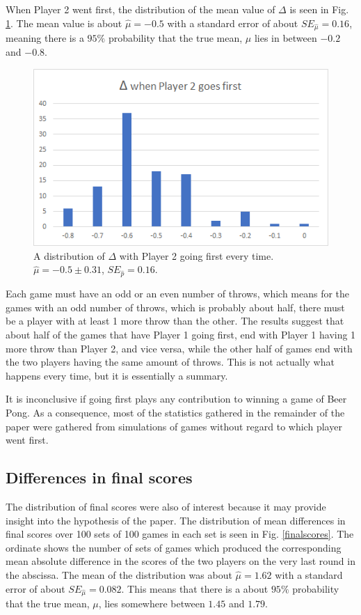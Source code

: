\documentclass{article}
\begin{document}
When Player 2 went first, the distribution of the mean value of $\Delta$ is seen in Fig. \ref{delta2goesfirst}. The mean value is about $\hat{\mu} = -0.5$ with a standard error of about $SE_{\hat{\mu}} = 0.16$, meaning there is a $95\%$ probability that the true mean, $\mu$ lies in between $-0.2$ and $-0.8$.

\begin{figure}
	\centering
	\includegraphics[width=0.7\linewidth]{delta2goesfirst}
	\caption{A distribution of $\Delta$ with Player 2 going first every time. $\hat{\mu} = -0.5 \pm 0.31$, $SE_{\hat{p}} = 0.16$.}
	\label{delta2goesfirst}
\end{figure}

Each game must have an odd or an even number of throws, which means for the games with an odd number of throws, which is probably about half, there must be a player with at least 1 more throw than the other. The results suggest that about half of the games that have Player 1 going first, end with Player 1 having 1 more throw than Player 2, and vice versa, while the other half of games end with the two players having the same amount of throws. This is not actually what happens every time, but it is essentially a summary.

It is inconclusive if going first plays any contribution to winning a game of Beer Pong. As a consequence, most of the statistics gathered in the remainder of the paper were gathered from simulations of games without regard to which player went first.

\subsection{Differences in final scores}
The distribution of final scores were also of interest because it may provide insight into the hypothesis of the paper. The distribution of mean differences in final scores over 100 sets of 100 games in each set is seen in Fig. \ref{finalscores}. The ordinate shows the number of sets of games which produced the corresponding mean absolute difference in the scores of the two players on the very last round in the abscissa. The mean of the distribution was about $\hat{\mu} = 1.62$ with a standard error of about $SE_{\hat{\mu}} = 0.082$. This means that there is a about $95\%$ probability that the true mean, $\mu$, lies somewhere between $1.45$ and $1.79$.
\end{document}
